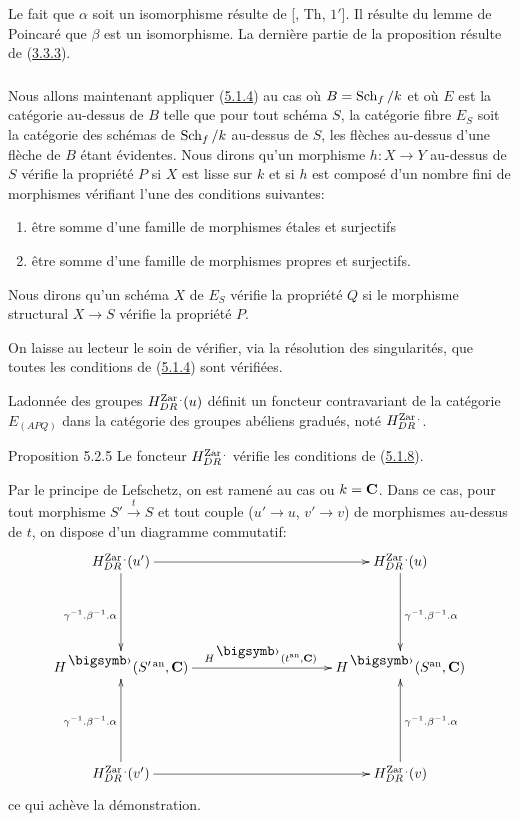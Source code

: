 \documentclass[10pt]{../fichiers-configuration-latex/smfart}
\begin{document}
Le fait que $\alpha$ soit un isomorphisme résulte de [\cite{SGA4-05bis:6}, Th, $1'$]. Il
résulte du lemme de Poincaré que $\beta$ est un isomorphisme. La
dernière partie de la proposition résulte de (\hyperref[Vbis.thm3.3.3]{3.3.3}).

\setcounter{subsubsection}{3}
\subsubsection{}
Nous allons maintenant appliquer (\hyperref[Vbis.subsubsec5.1.4]{5.1.4}) au cas où $B = \operatorname{Sch}_f /k$ et
où $E$ est la catégorie au-dessus de $B$ telle que pour tout schéma
$S$, la catégorie fibre $E_S$ soit la catégorie des
schémas de $\operatorname{Sch}_f
/k$ au-dessus de $S$, les flèches au-dessus d'une flèche de $B$ étant
évidentes. Nous dirons qu'un morphisme $h : X \to Y$ au-dessus de $S$
vérifie la propriété $P$ si $X$ est lisse sur $k$ et si $h$ est
composé d'un nombre fini de morphismes vérifiant l'une des conditions
suivantes:
\begin{enumerate}
\renewcommand{\theenumi}{\roman{enumi}}
\renewcommand{\labelenumi}{(\theenumi)}
\item être somme d'une famille de morphismes étales et surjectifs
\item être somme d'une famille de morphismes propres et surjectifs.
\end{enumerate}
Nous dirons qu'un schéma $X$ de $E_S$ vérifie la propriété $Q$ si le
morphisme structural $X \to S$ vérifie la propriété $P$.

On laisse au lecteur le soin de vérifier, via la résolution des
singularités, que toutes les conditions de (\hyperref[Vbis.subsubsec5.1.4]{5.1.4}) sont vérifiées.

La\pageoriginale donnée des groupes $H^{\operatorname{Zar}.}_{DR}(u)$ définit un foncteur
contravariant de la catégorie $E_{(APQ)}$ dans la catégorie des
groupes abéliens gradués, noté $H^{\operatorname{Zar}.}_{DR}$.

\begin{enonce*}{Proposition 5.2.5}
Le foncteur $H^{\operatorname{Zar}.}_{DR}$ vérifie les conditions de (\hyperref[Vbis.prop5.1.8]{5.1.8}).
\end{enonce*}

Par le principe de Lefschetz, on est ramené au cas ou $k =
\mathbf{C}$. Dans ce cas, pour tout morphisme $S'\xrightarrow{t} S$ et
tout couple ($u'\to u$, $v'\to v$) de morphismes au-dessus de $t$, on
dispose d'un diagramme commutatif:
\[
\xymatrix@C=3.5cm@R=2cm{
H^{\Zar.}_{DR}(u') \ar[r] \ar[d]_{\gamma^{-1}.\beta^{-1}.\alpha}&  H_{DR}^{\Zar.}(u)\ar[d]^{\gamma^{-1}.\beta^{-1}.\alpha}\\
H^{\bigdot}(S'^{\an},\CC)
\ar[r]^{H^{\bigdot}(t^{\an},\CC)}
& H^{\bigdot}(S^{\an},
\CC) \\
H^{\Zar.}_{DR}(v') \ar[r] \ar[u]^{\gamma^{-1}.\beta^{-1}.\alpha}& H_{DR}^{\Zar.}(v) \ar[u]_{\gamma^{-1}.\beta^{-1}.\alpha}
}
\]
ce qui achève la démonstration.
\end{document}
